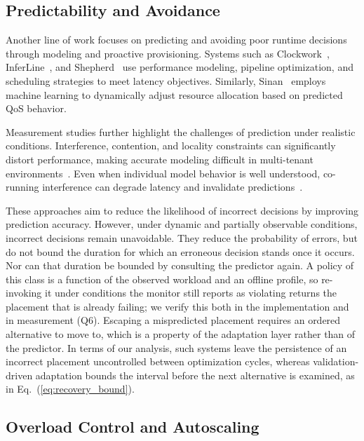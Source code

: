 \documentclass[conference]{IEEEtran}
\begin{document}
{\subsection{Predictability and Avoidance}

Another line of work focuses on predicting and avoiding poor runtime decisions through modeling and proactive provisioning.
Systems such as Clockwork~\cite{clockwork2020osdi}, InferLine~\cite{inferline2020socc}, and Shepherd~\cite{shepherd2023nsdi} use performance modeling, pipeline optimization, and scheduling strategies to meet latency objectives.
Similarly, Sinan~\cite{sinan2021asplos} employs machine learning to dynamically adjust resource allocation based on predicted QoS behavior.

Measurement studies further highlight the challenges of prediction under realistic conditions.
Interference, contention, and locality constraints can significantly distort performance, making accurate modeling difficult in multi-tenant environments~\cite{jeon2019philly, kim_iccd2024_interference}.
Even when individual model behavior is well understood, co-running interference can degrade latency and invalidate predictions~\cite{kim_iccd2024_interference}.

These approaches aim to reduce the likelihood of incorrect decisions by improving prediction accuracy.
However, under dynamic and partially observable conditions, incorrect decisions remain unavoidable.
They reduce the probability of errors, but do not bound the duration for which an erroneous decision stands once it occurs.
\textcolor{navyblue}{Nor can that duration be bounded by consulting the predictor again. A policy of this class is a function of the observed workload and an offline profile, so re-invoking it under conditions the monitor still reports as violating returns the placement that is already failing; we verify this both in the implementation and in measurement (Q6). Escaping a mispredicted placement requires an ordered alternative to move to, which is a property of the adaptation layer rather than of the predictor. In terms of our analysis, such systems leave the persistence of an incorrect placement uncontrolled between optimization cycles, whereas validation-driven adaptation bounds the interval before the next alternative is examined, as in Eq.~(\ref{eq:recovery_bound}).}


\subsection{Overload Control and Autoscaling}

}
\end{document}
